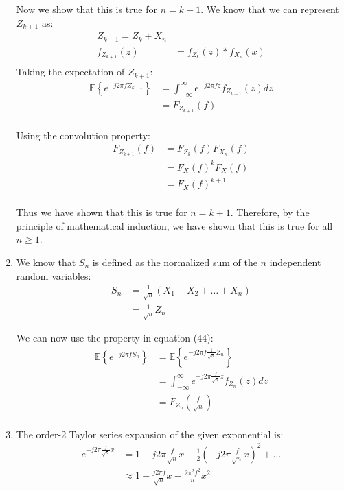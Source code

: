 \documentclass{article}
\begin{document}
\begin{enumerate}[label=1.\arabic*]
    Now we show that this is true for $n = k + 1$. We know that we can represent $Z_{k+1}$ as:
    \begin{align*}
        Z_{k+1} = Z_{k} + X_n \\
        f_{Z_{k+1}}(z) &= f_{Z_k}(z) \ast f_{X_n}(x) \\
    \end{align*}
    Taking the expectation of $Z_{k+1}$:
    \begin{align*}
        \mathbb{E}\left\{e^{-j2\pi f Z_{k+1}}\right\} &= \int_{-\infty}^{\infty} e^{-j2\pi f z} f_{Z_{k+1}}(z) dz \\
        &= F_{Z_{k+1}}(f) \\
    \end{align*}

    Using the convolution property:
    \begin{align*}
        F_{Z_{k+1}}(f) &= F_{Z_k}(f)F_{X_n}(f) \\
        &= F_{X}(f)^k F_{X}(f) \\
        &= F_{X}(f)^{k+1} \\
    \end{align*}

    Thus we have shown that this is true for $n = k + 1$. Therefore, by the principle of mathematical induction, we have shown that this is true for all $n \geq 1$.

    \item We know that $S_n$ is defined as the normalized sum of the $n$ independent random variables:
    \begin{align*}
        S_n &= \frac{1}{\sqrt{n}}(X_1 + X_2 + \ldots + X_n) \\
        &= \frac{1}{\sqrt{n}}Z_n
    \end{align*}

    We can now use the property in equation (44):
    \begin{align*}
        \mathbb{E}\left\{e^{-j2\pi f S_n}\right\} &= \mathbb{E}\left\{e^{-j2\pi f \frac{1}{\sqrt{n}}Z_n}\right\} \\
        &= \int_{-\infty}^{\infty} e^{-j2\pi \frac{f}{\sqrt{n}}z} f_{Z_n}(z) dz \\
        &= F_{Z_n}\left(\frac{f}{\sqrt{n}}\right) \\
    \end{align*}

    \item The order-2 Taylor series expansion of the given exponential is:
    \begin{align*}
        e^{-j2\pi \frac{f}{\sqrt{n}}x} &= 1 - j2\pi \frac{f}{\sqrt{n}}x + \frac{1}{2}\left(-j2\pi \frac{f}{\sqrt{n}}x\right)^2 + \ldots \\
        &\approx 1 - \frac{j2\pi f}{\sqrt{n}}x - \frac{2\pi^2 f^2}{n}x^2 \\
    \end{align*}


\end{enumerate}
\end{document}
